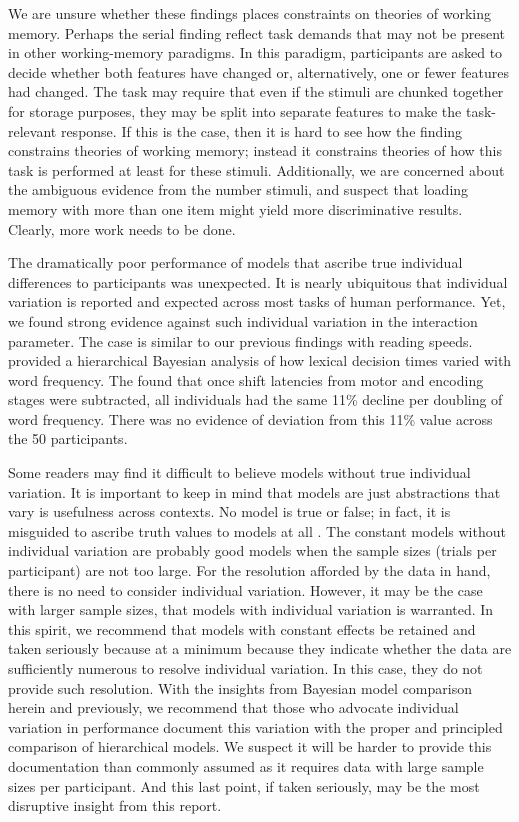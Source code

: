 \documentclass[fignum,nobf,man]{apa}
\begin{document}
We are unsure whether these findings places constraints on theories of working memory.  Perhaps the serial finding reflect task demands that may not be present in other working-memory paradigms.  In this paradigm, participants are asked to decide whether both features have changed or, alternatively, one or fewer features had changed.  The task may require that even if the stimuli are chunked together for storage purposes, they may be split into separate features to make the task-relevant response.    If this is the case, then it is hard to see how the finding constrains theories of working memory; instead it constrains theories of how this task is performed at least for these stimuli.  Additionally, we are concerned about the ambiguous evidence from the number stimuli, and suspect that loading memory with more than one item might yield more discriminative results.  Clearly, more work needs to be done.

The dramatically poor performance of models that ascribe true individual differences to participants was unexpected.  It is nearly ubiquitous that individual variation is reported and expected across most tasks of human performance.  Yet, we found strong evidence against such individual variation in the interaction parameter.    The case is similar to our previous findings with reading speeds.  \citet{Rouder:etal:2008d} provided a hierarchical Bayesian analysis of how lexical decision times varied with word frequency.  The found that once shift latencies from motor and encoding stages were subtracted, all individuals had the same 11\% decline per doubling of word frequency.  There was no evidence of deviation from this 11\% value across the 50 participants.

Some readers may find it difficult to believe models without true individual variation.    It is important to keep in mind that models are just abstractions that vary is usefulness across contexts.   No model is true or false; in fact, it is misguided to ascribe truth values to models at all \citep{deFinetti:1974,Morey:etal:2013}.  The constant models without individual variation are probably good models when the sample sizes (trials per participant) are not too large.  For the resolution afforded by the data in hand, there is no need to consider individual variation.  However, it may be the case with larger sample sizes, that models with individual variation is warranted.  In this spirit, we recommend that models with constant effects be retained and taken seriously because at a minimum because they indicate whether the data are sufficiently numerous to resolve individual variation.   In this case, they do not provide such resolution.  With the insights from Bayesian model comparison herein and previously, we recommend that those who advocate individual variation in performance document this variation with the proper and principled comparison of hierarchical models.  We suspect it will be harder to provide this documentation than commonly assumed as it requires data with large sample sizes per participant.  And this last point, if taken seriously, may be the most disruptive insight from this report.

\clearpage


\clearpage

\end{document}
